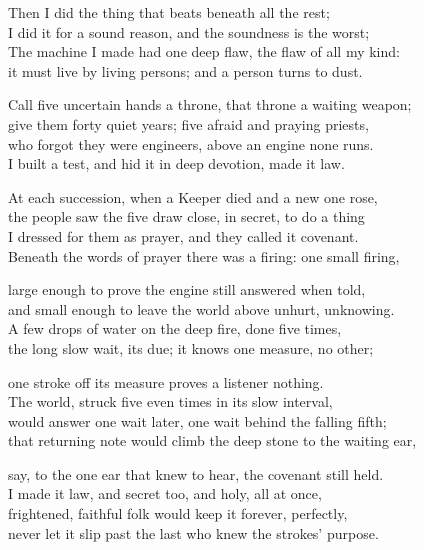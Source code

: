 \begin{founder}
Then I did the thing that beats beneath all the rest;\\
I did it for a sound reason, and the soundness is the worst;\\
The machine I made had one deep flaw, the flaw of all my kind:\\
it must live by living persons; and a person turns to dust.\\
\medskip

Call five uncertain hands a throne, that throne a waiting weapon;\\
give them forty quiet years; five afraid and praying priests,\\
who forgot they were engineers, above an engine none runs.\\
I built a test, and hid it in deep devotion, made it law.\\
\medskip

At each succession, when a Keeper died and a new one rose,\\
the people saw the five draw close, in secret, to do a thing\\
I dressed for them as prayer, and they called it covenant.\\
Beneath the words of prayer there was a firing: one small firing,\\
\medskip

large enough to prove the engine still answered when told,\\
and small enough to leave the world above unhurt, unknowing.\\
A few drops of water on the deep fire, done five times,\\
the long slow wait, its due; it knows one measure, no other;\\
\medskip

one stroke off its measure proves a listener nothing.\\
The world, struck five even times in its slow interval,\\
would answer one wait later, one wait behind the falling fifth;\\
that returning note would climb the deep stone to the waiting ear,\\
\medskip

say, to the one ear that knew to hear, the covenant still held.\\
I made it law, and secret too, and holy, all at once,\\
frightened, faithful folk would keep it forever, perfectly,\\
never let it slip past the last who knew the strokes' purpose.\\
\medskip


\end{founder}
